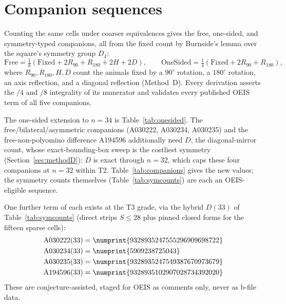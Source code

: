 \documentclass[11pt]{article}
\newcommand{\num}[1]{\numprint{#1}}
\newcommand{\tiertwo}{\textsf{T2}}
\newcommand{\tierthree}{\textsf{T3}}
\begin{document}
\section{Companion sequences}
\label{sec:companions}

Counting the same cells under coarser equivalences gives the free, one-sided,
and symmetry-typed companions, all from the fixed count by Burnside's lemma
over the square's symmetry group $D_4$:
\[
  \mathrm{Free}=\tfrac18(\mathrm{Fixed}+2R_{90}+R_{180}+2H+2D),\qquad
  \mathrm{OneSided}=\tfrac14(\mathrm{Fixed}+2R_{90}+R_{180}),
\]
where $R_{90},R_{180},H,D$ count the animals fixed by a $90^\circ$ rotation,
a $180^\circ$ rotation, an axis reflection, and a diagonal reflection
(Method~D). Every derivation asserts the $/4$ and $/8$ integrality of its numerator and
validates every published OEIS term of all five companions.

The one-sided extension to $n=34$ is Table~\ref{tab:onesided}. The
free/bilateral/asymmetric companions (A030222, A030234, A030235) and the
free-non-polyomino difference A194596 additionally need $D$, the
diagonal-mirror count, whose exact-bounding-box sweep is the costliest
symmetry (Section~\ref{sec:methodD}): $D$ is exact through $n=32$,
which caps these four companions at
$n=32$ within \tiertwo{}. Table~\ref{tab:companions} gives the new
values; the symmetry counts themselves (Table~\ref{tab:symcounts}) are each
an OEIS-eligible sequence.

One further term of each exists at the \tierthree{} grade, via the hybrid
$D(33)$ of Table~\ref{tab:symcounts} (direct strips $S\le28$ plus pinned
closed forms for the fifteen sparse cells):
\begin{align*}
  \text{A030222}(33)&=\num{9328935247555296909698722}\\
  \text{A030234}(33)&=\num{5909238725043}\\
  \text{A030235}(33)&=\num{9328935247549387670973679}\\
  \text{A194596}(33)&=\num{9328935102907028734392020}
\end{align*}
These are conjecture-assisted, staged for OEIS as comments only,
never as b-file data.
\end{document}
